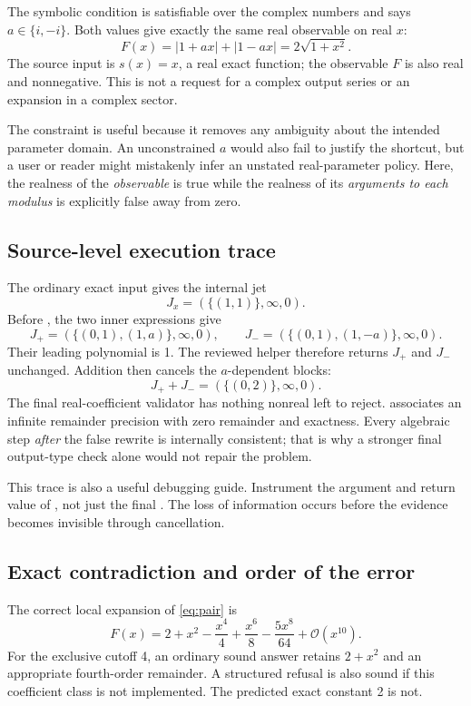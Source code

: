 \documentclass[11pt]{article}
\newcommand{\code}[1]{\texttt{\detokenize{#1}}}
\newcommand{\OO}{\mathcal O}
\theoremstyle{remark}\newtheorem{remark}[theorem]{Remark}
\begin{document}
The symbolic condition is satisfiable over the complex numbers and says
\(a\in\{i,-i\}\). Both values give exactly the same real observable on real \(x\):
\begin{equation}\label{eq:pair}
 F(x)=|1+ax|+|1-ax|=2\sqrt{1+x^2}.
\end{equation}
The source input is \(s(x)=x\), a real exact function; the observable \(F\) is
also real and nonnegative. This is not a request for a complex output series
or an expansion in a complex sector.

The constraint is useful because it removes any ambiguity about the intended
parameter domain. An unconstrained \(a\) would also fail to justify the shortcut,
but a user or reader might mistakenly infer an unstated real-parameter policy.
Here, the realness of the \emph{observable} is true while the realness of its
\emph{arguments to each modulus} is explicitly false away from zero.

\subsection{Source-level execution trace}
The ordinary exact input gives the internal jet
\[
 J_x=(\{(1,1)\},\infty,0).
\]
Before \code{Abs}, the two inner expressions give
\[
 J_+=(\{(0,1),(1,a)\},\infty,0),\qquad
 J_-=(\{(0,1),(1,-a)\},\infty,0).
\]
Their leading polynomial is 1. The reviewed helper therefore returns \(J_+\)
and \(J_-\) unchanged. Addition then cancels the \(a\)-dependent blocks:
\[
 J_++J_-=(\{(0,2)\},\infty,0).
\]
The final real-coefficient validator has nothing nonreal left to reject.
\code{seriesMake} associates an infinite remainder precision with zero remainder
and exactness. Every algebraic step \emph{after} the false \code{Abs} rewrite
is internally consistent; that is why a stronger final output-type check alone
would not repair the problem.\cite{core,operations}

This trace is also a useful debugging guide. Instrument the argument and return
value of \code{fwdAbs}, not just the final \code{GeneralizedSeries}. The loss of
information occurs before the evidence becomes invisible through cancellation.

\subsection{Exact contradiction and order of the error}
The correct local expansion of \eqref{eq:pair} is
\begin{equation}\label{eq:pairseries}
 F(x)=2+x^2-\frac{x^4}{4}+\frac{x^6}{8}
       -\frac{5x^8}{64}+\OO(x^{10}).
\end{equation}
For the exclusive cutoff 4, an ordinary sound answer retains \(2+x^2\) and an
appropriate fourth-order remainder. A structured refusal is also sound if this
coefficient class is not implemented. The predicted exact constant 2 is not.
\end{document}
